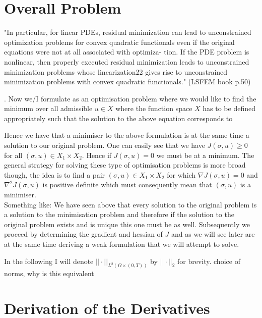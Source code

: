 \documentclass[../draft_1.tex]{subfiles}
\begin{document}
\section{Overall Problem}

"In particular, for linear PDEs, residual minimization can lead to unconstrained optimization problems for convex quadratic functionals even if the original equations were not at all associated with optimiza- tion. If the PDE problem is nonlinear, then properly executed residual minimization leads to unconstrained minimization problems whose linearization22 gives rise to unconstrained minimization problems with convex quadratic functionals." (LSFEM book p.50)
 




. Now we/I
formulate as an optimisation problem where we would like to find the minimum over all admissible $u \in X$ where the function space $ X$ has to be defined appropriately such that the solution to the above equation corresponds to 



Hence we have that a minimiser to the above formulation is at the same time a solution to our original problem. One can easily see that we have $J(\sigma, u) \geq 0$ for all $(\sigma, u) \in X_1 \times X_2$. Hence if $J(\sigma, u) = 0$ we must be at a minimum. The general strategy for solving these type of optimisation problems is more broad though, the idea is to find a pair $(\sigma, u) \in X_1 \times X_2$ for which $\nabla J(\sigma,u) = 0$  and $\nabla^2 J(\sigma, u)$ is positive definite which must consequently mean that $(\sigma, u)$ is a minimiser. \\
Something like: We have seen above that every solution to the original problem is a solution to the minimisation problem and therefore if the solution to the original problem exists and is unique this one must be as well. Subsequently we proceed by determining the gradient and hessian of $J$ and as we will see later are at the same time deriving a weak formulation that we will attempt to solve. 

In the following I will denote $|| \cdot ||_{L^2(\Omega \times (0,T))}$ by $|| \cdot ||_2$ for brevity. 
choice of norms, why is this equivalent


\section{Derivation of the Derivatives}
\end{document}
